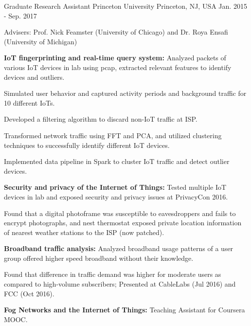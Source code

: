 \begin{cventries}
  \cventry
    {Graduate Research Assistant} %
    {Princeton University} %
    {Princeton, NJ, USA} %
    {Jan. 2015 - Sep. 2017} %
    {
      \begin{cvitems} %
      \item {Advisers: Prof. Nick Feamster (University of Chicago) and Dr. Roya Ensafi (University of Michigan)}
%      
      \item {\textbf{IoT fingerprinting and real-time query system:} Analyzed packets of various IoT devices in lab using pcap, extracted relevant features to identify devices and outliers.
      		}
      \item {Simulated user behavior and captured activity periods and background traffic for 10 different IoTs.}
      \item {Developed a filtering algorithm to discard non-IoT traffic at ISP.
      		}
      \item {Transformed network traffic using FFT and PCA, and utilized clustering techniques to successfully identify different IoT devices.}
      \item {Implemented data pipeline in Spark to cluster IoT traffic and detect outlier devices.}
%      
      \item {\textbf{Security and privacy of the Internet of Things:} Tested multiple IoT devices in lab and exposed security and privacy issues at PrivacyCon 2016.
      		}
      \item {Found that a digital photoframe was susceptible to eavesdroppers and fails to encrypt photographs, and nest thermostat exposed private location information of nearest weather stations to the ISP (now patched).}
%      		
      \item {\textbf{Broadband traffic analysis:} Analyzed broadband usage patterns of a user group offered higher speed broadband without their knowledge.
      		}
      \item {Found that difference in traffic demand was higher for moderate users as compared to high-volume subscribers; Presented at CableLabs (Jul 2016) and FCC (Oct 2016).}
%      
      \item {\textbf{Fog Networks and the Internet of Things:} Teaching Assistant for Coursera MOOC.
}
\end{cvitems}}
\end{cventries}
